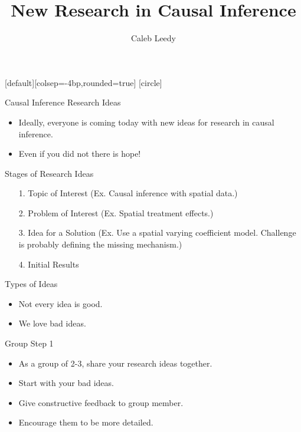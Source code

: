 \documentclass[handout]{beamer} %
\author[CL]{Caleb Leedy}
\title[Research]{New Research in Causal Inference}
\begin{document}
\everymath{\displaystyle}
[default][colsep=-4bp,rounded=true]
[circle]
\frame{\titlepage}

\begin{frame}{Causal Inference Research Ideas}

\begin{itemize}
  \item<1-> Ideally, everyone is coming today with new ideas for research in causal
    inference.
  \item<2-> Even if you did not there is hope!
\end{itemize}

\end{frame}

\begin{frame}{Stages of Research Ideas}

  \begin{itemize}
    \item[1.] Topic of Interest (Ex. Causal inference with spatial data.)
    \item[2.] Problem of Interest (Ex. Spatial treatment effects.)
    \item[3.] Idea for a Solution (Ex. Use a spatial varying coefficient model.
      Challenge is probably defining the missing mechanism.)
    \item[4.] Initial Results
  \end{itemize}

\end{frame}

\begin{frame}{Types of Ideas}

  \begin{itemize}
    \item<1-> Not every idea is good.
    \item<2-> We love bad ideas.
  \end{itemize}

\end{frame}

\begin{frame}{Group Step 1}

  \begin{itemize}
    \item As a group of 2-3, share your research ideas together.
    \item Start with your bad ideas.
    \item Give constructive feedback to group member.
    \item Encourage them to be more detailed.
  \end{itemize}

\end{frame}
\end{document}
